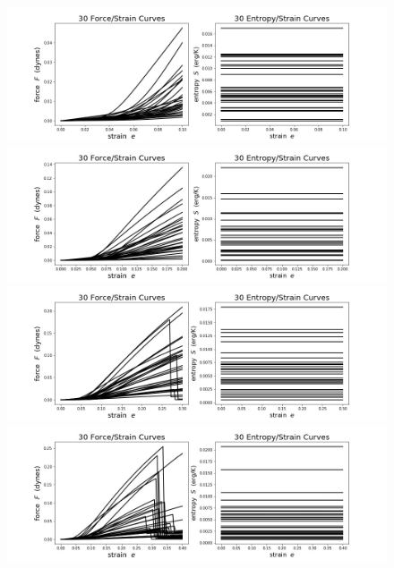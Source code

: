\begin{figure}
    \mbox{}\hspace{-1.5cm}
    \includegraphics[width=1.2\textwidth]{figures/septalChords10.jpg}
    \mbox{}\hspace{-1.5cm}
    \includegraphics[width=1.2\textwidth]{figures/septalChords20.jpg}
    \mbox{}\hspace{-1.5cm}
    \includegraphics[width=1.2\textwidth]{figures/septalChords30.jpg}
    \mbox{}\hspace{-1.5cm}
    \includegraphics[width=1.2\textwidth]{figures/septalChords40.jpg}

\end{figure}
